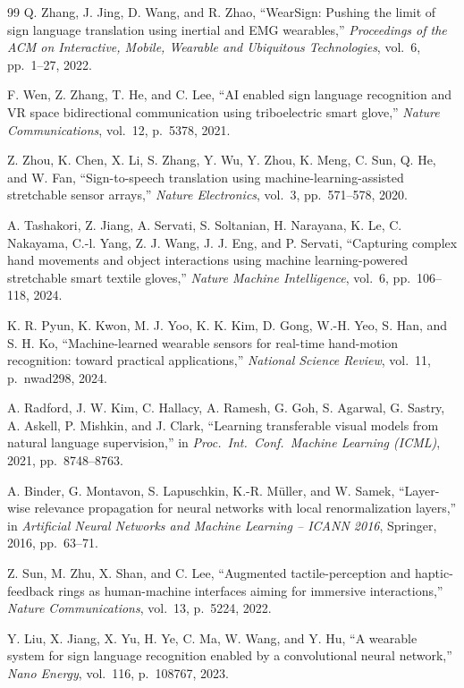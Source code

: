\documentclass[11pt, a4paper]{article}
\theoremstyle{definition}
\begin{document}
\begin{thebibliography}{99}
Q. Zhang, J. Jing, D. Wang, and R. Zhao,
``WearSign: Pushing the limit of sign language translation using inertial and EMG wearables,''
\textit{Proceedings of the ACM on Interactive, Mobile, Wearable and Ubiquitous Technologies}, vol.~6, pp.~1--27, 2022.

F. Wen, Z. Zhang, T. He, and C. Lee,
``AI enabled sign language recognition and VR space bidirectional communication using triboelectric smart glove,''
\textit{Nature Communications}, vol.~12, p.~5378, 2021.

Z. Zhou, K. Chen, X. Li, S. Zhang, Y. Wu, Y. Zhou, K. Meng, C. Sun, Q. He, and W. Fan,
``Sign-to-speech translation using machine-learning-assisted stretchable sensor arrays,''
\textit{Nature Electronics}, vol.~3, pp.~571--578, 2020.

A. Tashakori, Z. Jiang, A. Servati, S. Soltanian, H. Narayana, K. Le, C. Nakayama, C.-l. Yang, Z. J. Wang, J. J. Eng, and P. Servati,
``Capturing complex hand movements and object interactions using machine learning-powered stretchable smart textile gloves,''
\textit{Nature Machine Intelligence}, vol.~6, pp.~106--118, 2024.

K. R. Pyun, K. Kwon, M. J. Yoo, K. K. Kim, D. Gong, W.-H. Yeo, S. Han, and S. H. Ko,
``Machine-learned wearable sensors for real-time hand-motion recognition: toward practical applications,''
\textit{National Science Review}, vol.~11, p.~nwad298, 2024.

A. Radford, J. W. Kim, C. Hallacy, A. Ramesh, G. Goh, S. Agarwal, G. Sastry, A. Askell, P. Mishkin, and J. Clark,
``Learning transferable visual models from natural language supervision,''
in \textit{Proc.\ Int.\ Conf.\ Machine Learning (ICML)}, 2021, pp.~8748--8763.

A. Binder, G. Montavon, S. Lapuschkin, K.-R. M\"{u}ller, and W. Samek,
``Layer-wise relevance propagation for neural networks with local renormalization layers,''
in \textit{Artificial Neural Networks and Machine Learning -- ICANN 2016}, Springer, 2016, pp.~63--71.

Z. Sun, M. Zhu, X. Shan, and C. Lee,
``Augmented tactile-perception and haptic-feedback rings as human-machine interfaces aiming for immersive interactions,''
\textit{Nature Communications}, vol.~13, p.~5224, 2022.

Y. Liu, X. Jiang, X. Yu, H. Ye, C. Ma, W. Wang, and Y. Hu,
``A wearable system for sign language recognition enabled by a convolutional neural network,''
\textit{Nano Energy}, vol.~116, p.~108767, 2023.


\end{thebibliography}
\end{document}
